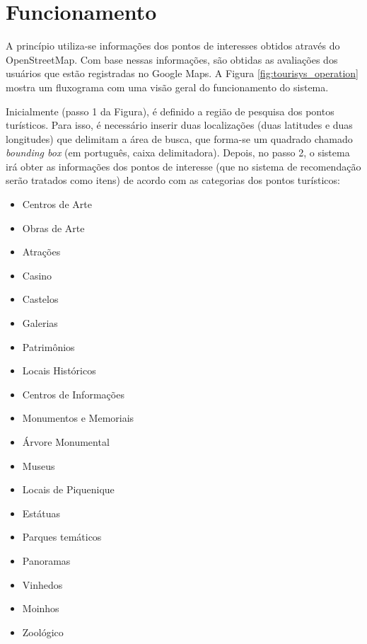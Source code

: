 \section{Funcionamento}
\label{sec:operation}

A princípio utiliza-se informações dos pontos de interesses obtidos através do OpenStreetMap. Com base nessas informações, são obtidas as avaliações dos usuários que estão registradas no Google Maps. A Figura \ref{fig:tourisys_operation} mostra um fluxograma com uma visão geral do funcionamento do sistema.

Inicialmente (passo 1 da Figura), é definido a região de pesquisa dos pontos turísticos. Para isso, é necessário inserir duas localizações (duas latitudes e duas longitudes) que delimitam a área de busca, que forma-se um quadrado chamado \textit{bounding box} (em português, caixa delimitadora). Depois, no passo 2, o sistema irá obter as informações dos pontos de interesse (que no sistema de recomendação serão tratados como itens) de acordo com as categorias dos pontos turísticos:

\begin{multicols}{2}
    \begin{itemize}
        \itemsep0em
        \item Centros de Arte
        \item Obras de Arte
        \item Atrações
        \item Casino
        \item Castelos
        \item Galerias
        \item Patrimônios
        \item Locais Históricos
        \item Centros de Informações
        \item Monumentos e Memoriais
        \item Árvore Monumental
        \item Museus
        \item Locais de Piquenique
        \item Estátuas
        \item Parques temáticos
        \item Panoramas
        \item Vinhedos
        \item Moinhos
        \item Zoológico
    \end{itemize}
\end{multicols}

